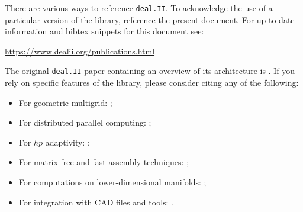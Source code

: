 \documentclass{ansarticle}
\newcommand{\specialword}[1]{\texttt{#1}}
\newcommand{\dealii}{{\specialword{deal.II}}}
\begin{document}
There are various ways to reference \dealii{}. To acknowledge the use of a
particular version of the library, reference the present document. For
up to date information and bibtex snippets for this document see:

\bigskip

\begin{center}
 \url{https://www.dealii.org/publications.html}
\end{center}

\bigskip


The original \texttt{\dealii{}} paper containing an overview of its
architecture is \cite{BangerthHartmannKanschat2007}. If you rely on specific
features of the library, please consider citing any of the following:
\begin{itemize}
 \item For geometric multigrid: \cite{Kanschat2004,JanssenKanschat2011};
 \item For distributed parallel computing: \cite{BangerthBursteddeHeisterKronbichler11};
 \item For $hp$ adaptivity: \cite{BangerthKayserHerold2007};
 \item For matrix-free and fast assembly techniques:
   \cite{KronbichlerKormann2012};
 \item For computations on lower-dimensional manifolds:
   \cite{DeSimoneHeltaiManigrasso2009};
 \item For integration with CAD files and tools:
   \cite{HeltaiMola2015}.
\end{itemize}
\end{document}
